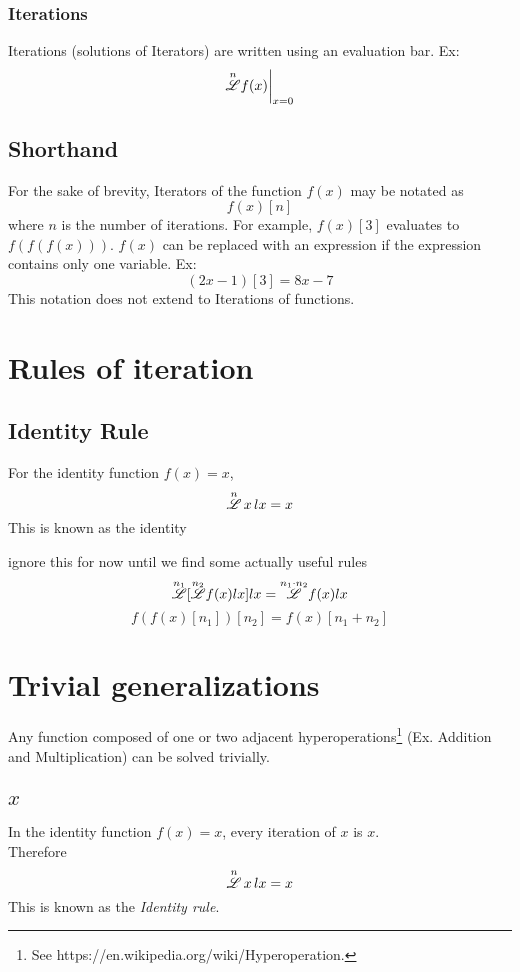 \documentclass[12pt, letterpaper]{article}
\begin{document}
\subsubsection{Iterations}
Iterations (solutions of Iterators) are written using an evaluation bar. Ex:
$$\overset{n}{\mathscr{L}}f(x)\bigg|_{x=0}$$

\subsection{Shorthand}
For the sake of brevity, Iterators of the function $f(x)$ may be notated as
$$f(x)[n]$$ 
where $n$ is the number of iterations. For example, $f(x)[3]$ evaluates to $f(f(f(x)))$. $f(x)$ can be replaced with an expression if the expression contains only one variable. Ex:
$$(2x-1)[3] = 8x-7$$
This notation does not extend to Iterations of functions.

\section{Rules of iteration}

\subsection{Identity Rule}
For the identity function $f(x) = x$, 
\[
\overset{n}{\mathscr{L}} \, x \, lx = x
\]
This is known as the identity 

ignore this for now until we find some actually useful rules
$$\overset{n_1}{\mathscr{L}}[\overset{n_2}{\mathscr{L}} f(x) lx] lx = \overset{n_1\cdot n_2}{\mathscr{L}} f(x) lx$$
$$f(f(x)[n_1])[n_2] = f(x)[n_1+n_2]$$

\section{Trivial generalizations}
Any function composed of one or two adjacent hyperoperations\footnote{See https://en.wikipedia.org/wiki/Hyperoperation.} (Ex. Addition and Multiplication) can be solved trivially.

\subsection{$x$}
In the identity function \(f(x) = x\), every iteration of \(x\) is \(x\). 
\\
Therefore
$$\overset{n}{\mathscr{L}} \, x \, lx = x$$
This is known as the \textit{Identity rule}.
\end{document}
